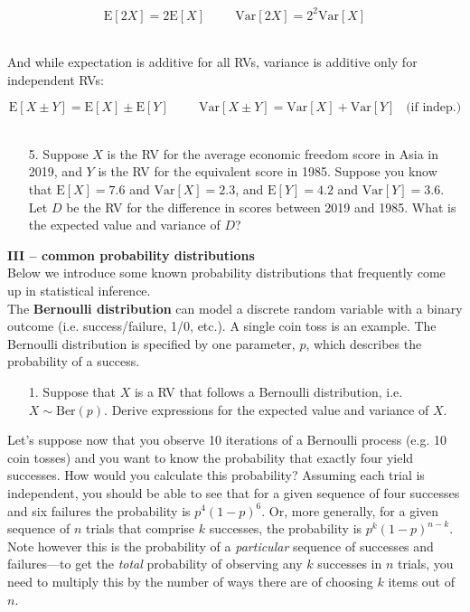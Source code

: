 \documentclass[10pt]{extarticle}
\newcommand{\E}{\text{E}}
\newcommand{\Var}{\text{Var}}
\begin{document}
$$\E[2X] = 2 \E[X] \hspace{1cm} \Var[2X] = 2^2 \Var[X]$$ \ 

And while expectation is additive for all RVs, variance is additive only for independent RVs: 

$$\E[X \pm Y] = \E[X] \pm \E[Y] \hspace{1cm} \Var[X \pm Y] = \Var[X] + \Var[Y] \;\;\; \text{(if indep.)}$$ \ 

\begin{itemize}

	\item[5.] Suppose $X$ is the RV for the average economic freedom score in Asia in 2019, and $Y$ is the RV for the equivalent score in 1985. Suppose you know that $\E[X] = 7.6$ and $\Var[X] = 2.3$, and $\E[Y] = 4.2$ and $\Var[Y] = 3.6$. Let $D$ be the RV for the difference in scores between 2019 and 1985. What is the expected value and variance of $D$?  

\end{itemize}





\hfill 

\hfill 

{\bf \Large III -- common probability distributions} \\ 

Below we introduce some known probability distributions that frequently come up in statistical inference. \\ 

The {\bf Bernoulli distribution} can model a discrete random variable with a binary outcome (i.e. success/failure, 1/0, etc.). A single coin toss is an example. The Bernoulli distribution is specified by one parameter, $p$, which describes the probability of a success.  

\hfill 

\begin{itemize}

	\item[1.] Suppose that $X$ is a RV that follows a Bernoulli distribution, i.e. $X \sim \text{Ber}(p)$. Derive expressions for the expected value and variance of $X$. 

\end{itemize}

\hfill 

Let's suppose now that you observe 10 iterations of a Bernoulli process (e.g. 10 coin tosses) and you want to know the probability that exactly four yield successes. How would you calculate this probability? Assuming each trial is independent, you should be able to see that for a given sequence of four successes and six failures the probability is $p^4 (1-p)^6$. Or, more generally, for a given sequence of $n$ trials that comprise $k$ successes, the probability is $p^k (1-p)^{n-k}$. Note however this is the probability of a {\it particular} sequence of successes and failures---to get the {\it total} probability of observing any $k$ successes in $n$ trials, you need to multiply this by the number of ways there are of choosing $k$ items out of $n$. \\ 
\end{document}
